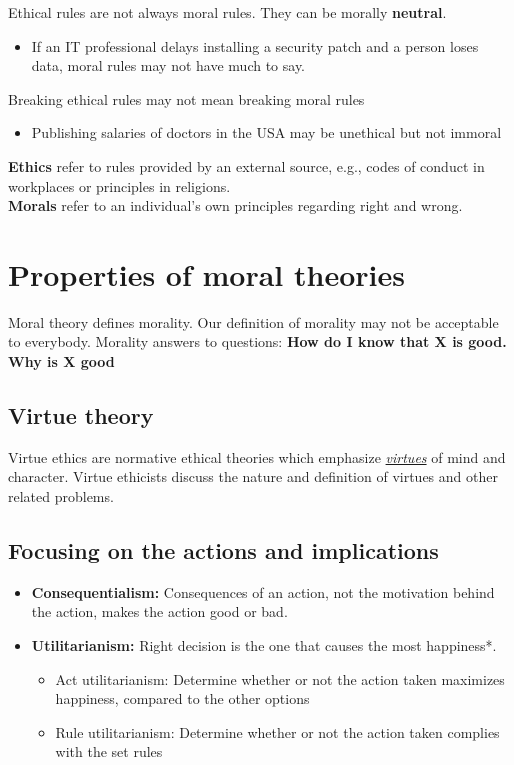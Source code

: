 \documentclass{article}
\newcommand{\worddef}[1]{\hyperref[sec:reference]{\textit{#1}}}
\begin{document}
\begin{flushleft}
Ethical rules are not always moral rules. They can be morally \textbf{neutral}.
\begin{itemize}
  \item If an IT professional delays installing a security patch and a person loses data, moral rules may not have much to say.
\end{itemize}
Breaking ethical rules may not mean breaking moral rules
\begin{itemize}
  \item Publishing salaries of doctors in the USA may be unethical but not immoral
\end{itemize}
\textbf{Ethics} refer to rules provided by an external source, e.g., codes of conduct in workplaces or principles in religions.\\ \textbf{Morals} refer to an individual’s own principles regarding right and wrong.

\end{flushleft}

\section{Properties of moral theories}

\begin{flushleft}
Moral theory defines morality. Our definition of morality may not be acceptable to everybody.
Morality answers to questions: \textbf{How do I know that X is good. Why is X good}
\end{flushleft}

\subsection{Virtue theory}
Virtue ethics are normative ethical theories which emphasize \worddef{virtues} of mind and character. Virtue ethicists discuss the nature and definition of virtues and other related problems.

\subsection{Focusing on the actions and implications}
\begin{itemize}
  \item \textbf{Consequentialism:} Consequences of an action, not the motivation behind the action, makes the action good or bad.
  \item \textbf{Utilitarianism:} Right decision is the one that causes the most happiness*.
  \begin{itemize}
    \item Act utilitarianism: Determine whether or not the action taken maximizes happiness, compared to the other options
    \item Rule utilitarianism: Determine whether or not the action taken complies with the set rules
  \end{itemize}
\end{itemize}
\end{document}
